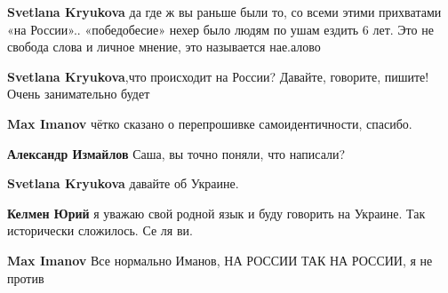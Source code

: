 \begin{itemize}
\begin{itemize}
\textbf{Svetlana Kryukova} да где ж вы раньше были то, со всеми этими прихватами «на России».. «победобесие» нехер было людям по ушам ездить 6 лет. Это не свобода слова и личное мнение, это называется нае.алово

 
\textbf{Svetlana Kryukova},что происходит на России? Давайте, говорите, пишите! Очень занимательно будет 🤣

 
\textbf{Max Imanov} чётко сказано о перепрошивке самоидентичности, спасибо.

 
\textbf{Александр Измайлов} Саша, вы точно поняли, что написали? 🤔

 
\textbf{Svetlana Kryukova} давайте об Украине.

 
\textbf{Келмен Юрий} я уважаю свой родной язык и буду говорить на Украине. Так исторически сложилось. Се ля ви.

 
\textbf{Max Imanov} Все нормально Иманов, НА РОССИИ ТАК НА РОССИИ, я не против


\end{itemize}
\end{itemize}
